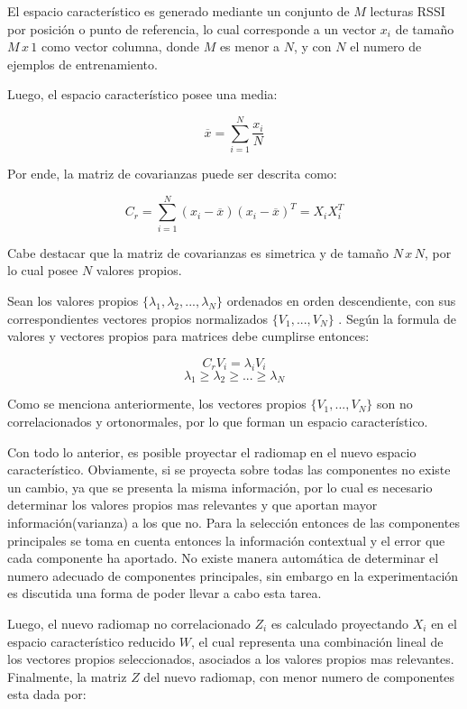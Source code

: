 El espacio característico es generado mediante un conjunto de $M$ lecturas RSSI por posición o punto de referencia, lo cual corresponde a un vector $x_{i}$ de tamaño $ M \, x \, 1$ como vector columna, donde $ M$ es menor a $ N$, y con $ N$ el numero de ejemplos de entrenamiento.

Luego, el espacio característico posee una media:

$$ \overline{x} = \sum_{i=1}^{N} \frac{x_{i}}{N} $$

Por ende, la matriz de covarianzas puede ser descrita como:

$$ C_{r} = \sum_{i=1}^{N} (x_{i} - \overline{x})(x_{i} - \overline{x})^T = X_{i}X_{i}^T$$

Cabe destacar que la matriz de covarianzas es simetrica y de tamaño $N \, x \, N$, por lo cual posee $N$ valores propios.

Sean los valores propios $ \{ \lambda_{1}, \lambda_{2}, ..., \lambda_{N} \} $ ordenados en orden descendiente, con sus correspondientes vectores propios normalizados $ \{ V_{1}, ... , V_{N} \} $ . Según la formula de valores y vectores propios para matrices debe cumplirse entonces:

$$ C_{r} V_{i} =  \lambda_{i} V_{i}$$
$$ \lambda_{1} \geq \lambda_{2} \geq ... \geq \lambda_{N}$$

Como se menciona anteriormente, los vectores propios $ \{ V_{1}, ... , V_{N} \} $ son no correlacionados y ortonormales, por lo que forman un espacio característico.

Con todo lo anterior, es posible proyectar el radiomap en el nuevo espacio característico. Obviamente, si se proyecta sobre todas las componentes no existe un cambio, ya que se presenta la misma información, por lo cual es necesario determinar los valores propios mas relevantes y que aportan mayor información(varianza) a los que no. Para la selección entonces de las componentes principales se toma en cuenta entonces la información contextual y el error que cada componente ha aportado. No existe manera automática de determinar el numero adecuado de componentes principales, sin embargo en la experimentación es discutida una forma de poder llevar a cabo esta tarea. 

Luego, el nuevo radiomap no correlacionado $Z_{i}$ es calculado proyectando $X_{i}$ en el espacio característico reducido $W$, el cual representa una combinación lineal de los vectores propios seleccionados, asociados a los valores propios mas relevantes. Finalmente, la matriz $Z$ del nuevo radiomap, con menor numero de componentes esta dada por:

